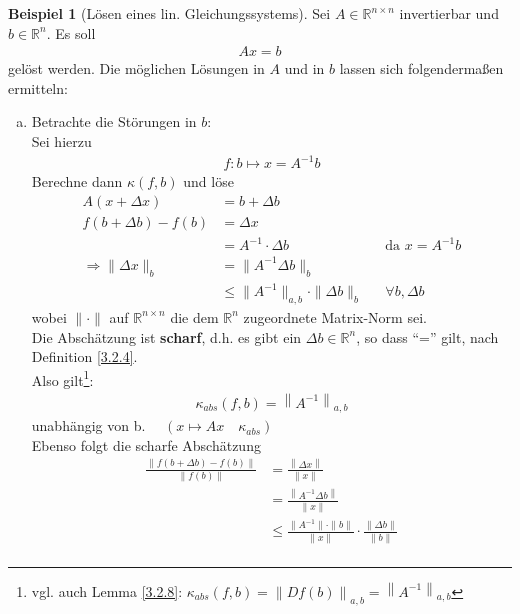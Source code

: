 \documentclass[ngerman,fontsize=11pt, paper=a4, parskip=half, titlepage=true, toc=bib]{scrbook}
\theoremstyle{definition}
\newtheorem{Bsp}[Def]{Beispiel}
\theoremstyle{plain}
\newcommand{\R}{\mathds{R}}
\newcommand{\Ren}{\mathds{R}^{n}}
\newcommand{\Renn}{\mathds{R}^{n\times n}}
\newcommand{\nn}[1]{\left\| #1 \right\|}
\newcommand{\subsectione}[1]{\addtocounter{Def}{1}\subsection{#1}}
\newenvironment{Bspe}[1][]{ %
  \begin{Bsp}[#1]
  }
  {
  \end{Bsp}
  \addtocounter{subsection}{1}
}
\begin{document}
\begin{Bspe}[Lösen eines lin. Gleichungssystems]
  \label{3.2.10}
  Sei $A\in \R^{n\times n}$ invertierbar und $b\in \R^n$. Es soll 
  \begin{gather*}
    Ax =b
  \end{gather*}
  gelöst werden.
  Die möglichen Lösungen in $A$ und in $b$ lassen sich folgendermaßen ermitteln:
  \begin{enumerate}[a)]
  \item Betrachte die Störungen in $b$:\\
    Sei hierzu
    \begin{gather*}
      f: b\mapsto x= A^{-1}b 
    \end{gather*}
    Berechne dann $ \kappa(f,b)$ und löse 
    \begin{align*}
      A(x + \Delta x) &= b+\Delta b \\
      f(b + \Delta b) - f(b) &= \Delta x \\
                      &= A^{-1} \cdot \Delta b && \text{da }x = A^{-1}b \\
      \Rightarrow \|\Delta x\|_{b}  &= \|A^{-1}\Delta b\|_{b} \\
                      &\leq \|A^{-1}\|_{a,b}\cdot \|\Delta b\|_{b} && \forall b, \Delta b 
    \end{align*}
    wobei $\|\cdot\| $ auf $\Renn$ die dem $\Ren$ zugeordnete Matrix-Norm sei. \\
    Die Abschätzung ist \textbf{scharf}, 
    d.h. es gibt ein $\Delta b\in \R^n$, so dass \enquote{=} gilt, 
    nach Definition \ref{3.2.4}. \\
    Also gilt\footnote{vgl. auch Lemma \ref{3.2.8}: $\kappa_{abs}(f,b)=\nn{Df(b)}_{a,b}=\nn{A^{-1}}_{a,b}$}:
    \begin{gather}
      \kappa_{abs}(f,b) = \nn{A^{-1}}_{a,b} \label{III.2.6}
    \end{gather}
    unabhängig von b.  $ \quad \left( x\mapsto Ax \quad \kappa_{abs}\right)$\\
    Ebenso folgt die scharfe Abschätzung 
    \begin{align}
      \nonumber
      \frac{\|	f(b + \Delta b) - f(b)\|}{\|f(b)\|} &= \frac{\nn{\Delta x}}{\nn{x}}\\ \nonumber
                                                    & = \frac{\nn{A^{-1}\Delta b}}{\nn{x}} \\ \nonumber
                                                    & \leq  \frac{\|A^{-1}\|\cdot \|b\|}{\|x\|} \cdot \frac{\|\Delta b\|}{\|b\|} \\

\end{align}
\end{enumerate}
\end{Bspe}
\end{document}
